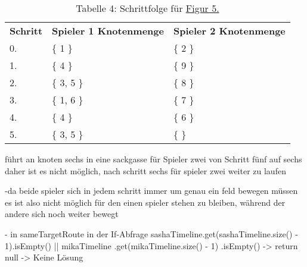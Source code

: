 \documentclass[a4paper,10pt,ngerman]{scrartcl}
\begin{document}
    \begin{table}[h!]
        \centering
        \begin{tabular}{lll}
            \textbf{Schritt} & \textbf{Spieler 1 Knotenmenge} & \textbf{Spieler 2 Knotenmenge} \\
            0.               & \{ 1 \}                        & \{ 2 \}                        \\
            1.               & \{  4 \}                         & \{  9 \}                         \\
            2.               & \{  3, 5 \}                      & \{  8 \}                         \\
            3.               & \{  1, 6 \}                      & \{  7 \}                         \\
            4.               & \{  4 \}                         & \{  6 \}                         \\
            5.               & \{  3, 5 \}                      & \{  \}                           \\
        \end{tabular}
        \caption{Tabelle 4: Schrittfolge für \hyperref[fig:Figure5]{Figur 5.}}
        \label{tab:Table4}
    \end{table}

    führt an knoten sechs in eine sackgasse für Spieler zwei von Schritt fünf auf sechs
    daher ist es nicht möglich, nach schritt sechs für spieler zwei weiter zu laufen

    -da beide spieler sich in jedem schritt immer um genau ein feld bewegen müssen
    es ist also nicht möglich für den einen spieler stehen zu bleiben,
    während der andere sich noch weiter bewegt

    - in sameTargetRoute in der If-Abfrage
    sashaTimeline.get(sashaTimeline.size() - 1).isEmpty() || mikaTimeline
    .get(mikaTimeline.size() - 1)
    .isEmpty()
    -> return null -> Keine Lösung
\end{document}
